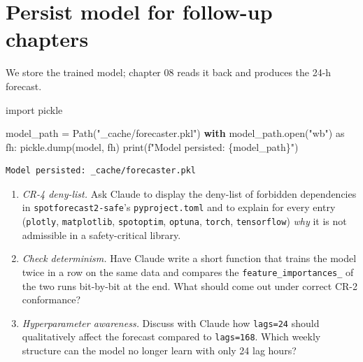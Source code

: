 \documentclass[
  english,
  letterpaper,
]{scrbook}
\newenvironment{Shaded}{\begin{snugshade}}{\end{snugshade}}
\newcommand{\BuiltInTok}[1]{\textcolor[rgb]{0.00,0.23,0.31}{#1}}
\newcommand{\ControlFlowTok}[1]{\textcolor[rgb]{0.00,0.23,0.31}{\textbf{#1}}}
\newcommand{\ImportTok}[1]{\textcolor[rgb]{0.00,0.46,0.62}{#1}}
\newcommand{\NormalTok}[1]{\textcolor[rgb]{0.00,0.23,0.31}{#1}}
\newcommand{\OperatorTok}[1]{\textcolor[rgb]{0.37,0.37,0.37}{#1}}
\newcommand{\SpecialCharTok}[1]{\textcolor[rgb]{0.37,0.37,0.37}{#1}}
\newcommand{\SpecialStringTok}[1]{\textcolor[rgb]{0.13,0.47,0.30}{#1}}
\newcommand{\StringTok}[1]{\textcolor[rgb]{0.13,0.47,0.30}{#1}}
\providecommand{\tightlist}{%
  \setlength{\itemsep}{0pt}\setlength{\parskip}{0pt}}
\begin{document}
\section{Persist model for follow-up
chapters}\label{persist-model-for-follow-up-chapters}

We store the trained model; chapter 08 reads it back and produces the
24-h forecast.

\protect{}\label{persist-model}
\begin{Shaded}
\begin{Highlighting}[]
\ImportTok{import}\NormalTok{ pickle}

\NormalTok{model\_path }\OperatorTok{=}\NormalTok{ Path(}\StringTok{"\_cache/forecaster.pkl"}\NormalTok{)}
\ControlFlowTok{with}\NormalTok{ model\_path.}\BuiltInTok{open}\NormalTok{(}\StringTok{"wb"}\NormalTok{) }\ImportTok{as}\NormalTok{ fh:}
\NormalTok{    pickle.dump(model, fh)}
\BuiltInTok{print}\NormalTok{(}\SpecialStringTok{f"Model persisted: }\SpecialCharTok{\{}\NormalTok{model\_path}\SpecialCharTok{\}}\SpecialStringTok{"}\NormalTok{)}
\end{Highlighting}
\end{Shaded}

\begin{verbatim}
Model persisted: _cache/forecaster.pkl
\end{verbatim}

\begin{tcolorbox}[enhanced jigsaw, arc=.35mm, bottomrule=.15mm, bottomtitle=1mm, breakable, colback=white, colbacktitle=quarto-callout-tip-color!10!white, colframe=quarto-callout-tip-color-frame, coltitle=black, left=2mm, leftrule=.75mm, opacityback=0, opacitybacktitle=0.6, rightrule=.15mm, title=\textcolor{quarto-callout-tip-color}{\faLightbulb}\hspace{0.5em}{Exercises (with Claude)}, titlerule=0mm, toprule=.15mm, toptitle=1mm]

\begin{enumerate}
\def\labelenumi{\arabic{enumi}.}
\tightlist
\item
  \emph{CR-4 deny-list.} Ask Claude to display the deny-list of
  forbidden dependencies in \texttt{spotforecast2-safe}'s
  \texttt{pyproject.toml} and to explain for every entry
  (\texttt{plotly}, \texttt{matplotlib}, \texttt{spotoptim},
  \texttt{optuna}, \texttt{torch}, \texttt{tensorflow}) \emph{why} it is
  not admissible in a safety-critical library.
\item
  \emph{Check determinism.} Have Claude write a short function that
  trains the model twice in a row on the same data and compares the
  \texttt{feature\_importances\_} of the two runs bit-by-bit at the end.
  What should come out under correct CR-2 conformance?
\item
  \emph{Hyperparameter awareness.} Discuss with Claude how
  \texttt{lags=24} should qualitatively affect the forecast compared to
  \texttt{lags=168}. Which weekly structure can the model no longer
  learn with only 24 lag hours?
\end{enumerate}

\end{tcolorbox}
\end{document}
